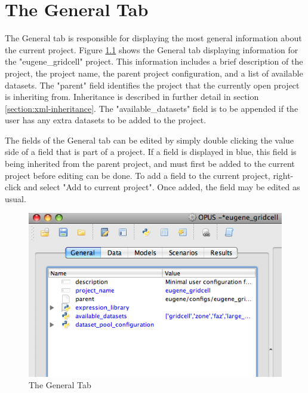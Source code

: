 \chapter{The General Tab}

The General tab is responsible for displaying the most general information about the current project.  Figure \ref{fig:general} shows the General tab displaying information for the "eugene\_gridcell" project.  This information includes a brief description of the project, the project name, the parent project configuration, and a list of available datasets.  The "parent" field identifies the project that the currently open project is inheriting from.  Inheritance is described in further detail in section \ref{section:xml-inheritance}.  The "available\_datasets" field is to be appended if the user has any extra datasets to be added to the project.

The fields of the General tab can be edited by simply double clicking the value side of a field that is part of a project.  If a field is displayed in blue, this field is being inherited from the parent project, and must first be added to the current project before editing can be done. To add a field to the current project, right-click and select "Add to current project".  Once added, the field may be edited as usual.

\begin{figure}[htp]
\begin{center}
\includegraphics[scale=0.6]{part-gui/images/general-tab.png}
\end{center}
\caption{The General Tab}
\label{fig:general}
\end{figure}

